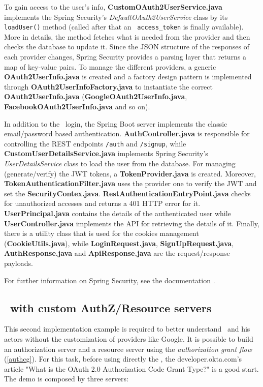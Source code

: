 To gain access to the user's info, \textbf{CustomOAuth2UserService.java} implements the Spring Security's \textit{DefaultOAuth2UserService} class by its \texttt{loadUser()} method (called after that an \oauth\ \texttt{access\_token} is finally available). More in details, the method fetches what is needed from the provider and then checks the database to update it. Since the JSON structure of the responses of each provider changes, Spring Security provides a parsing layer that returns a map of key-value pairs. To manage the different providers, a generic \textbf{OAuth2UserInfo.java} is created and a factory design pattern is implemented through \textbf{OAuth2UserInfoFactory.java} to instantiate the correct \textbf{OAuth2UserInfo.java} (\textbf{GoogleOAuth2UserInfo.java}, \textbf{FacebookOAuth2UserInfo.java} and so on).

In addition to the \oauth\ login, the Spring Boot server implements the classic email/password based authentication. \textbf{AuthController.java} is responsible for controlling the REST endpoints \texttt{/auth} and \texttt{/signup}, while \textbf{CustomUserDetailsService.java} implements Spring Security's \textit{UserDetailsService} class to load the user from the database. For managing (generate/verify) the JWT tokens, a \textbf{TokenProvider.java} is created. Moreover, \textbf{TokenAuthenticationFilter.java} uses the provider one to verify the JWT and set the \textbf{SecurityContex.java}. \textbf{RestAuthenticationEntryPoint.java} checks for unauthorized accesses and returns a 401 HTTP error for it. \textbf{UserPrincipal.java} contains the details of the authenticated user while \textbf{UserController.java} implements the API for retrieving the details of it. Finally, there is a utility class that is used for the cookies management (\textbf{CookieUtils.java}), while \textbf{LoginRequest.java}, \textbf{SignUpRequest.java}, \textbf{AuthResponse.java} and \textbf{ApiResponse.java} are the request/response payloads.

For further information on Spring Security, see the documentation \cite{sprsec}.

\subsection{\oauth\ with custom AuthZ/Resource servers}
This second implementation example is required to better understand \oauth\ and his actors without the customization of providers like Google. It is possible to build an authorization server and a resource server using the \textit{authorization grant flow} (\ref{authcg}). For this task, before using directly the , the developer.okta.com's article "What is the OAuth 2.0 Authorization Code Grant Type?" \cite{oauth2} is a good start. The demo is composed by three servers:

